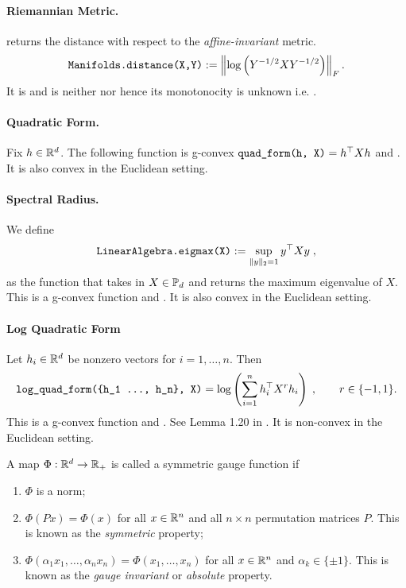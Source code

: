 \documentclass[twoside,11pt]{article}
\begin{document}
\paragraph{Riemannian Metric.}
 returns the distance with respect to the \textit{affine-invariant} metric. 
\[
\texttt{Manifolds.distance(X,Y)} := \left\|\log \left(Y^{-1/2}X Y^{-1/2}\right)\right\|_F.
\] 
It is  and is neither  nor  hence its monotonocity is unknown i.e. .

\paragraph{Quadratic Form.}
Fix $h \in \mathbb{R}^d$. The following function is g-convex $\texttt{quad\_form(h, X)} = h^\top X h$ and . It is also convex in the Euclidean setting. 


\paragraph{Spectral Radius.} We define
\[\texttt{LinearAlgebra.eigmax(X)} := \sup_{\|y\|_2 = 1}y^\top X y  \; ,\]
as the function that takes in $X \in \mathbb{P}_d$ and returns the maximum eigenvalue of $X$. This is a g-convex function and . It is also convex in the Euclidean setting.


\paragraph{Log Quadratic Form}

 Let $h_i \in \mathbb{R}^d$ be nonzero vectors for $i = 1, \ldots, n$. Then  
\[
\texttt{log\_quad\_form(\{h\_1 \ldots, h\_n\}, X)} = \log \left(\sum_{i=1}^n h_i^\top X^{r} h_i \right) \; , \qquad r \in \{-1, 1\}.
\]
This is a g-convex function and . See Lemma 1.20 in \citep{wieselstructuredcovariance}. It is non-convex in the Euclidean setting.


\begin{definition} 
     A map $\Phi:\mathbb{R}^d \to \mathbb{R}_+$ is called a symmetric gauge function if 
    \begin{enumerate}
        \item $\Phi$ is a norm;
        \item $\Phi(Px) = \Phi(x)$ for all $x \in \mathbb{R}^n$ and all $n\times n$ permutation matrices $P$. This is known as the \textit{symmetric} property;
        \item $\Phi(\alpha_1 x_1, \ldots, \alpha_n x_n) = \Phi(x_1, \ldots, x_n)$ for all $x \in \mathbb{R}^n$ and $\alpha_k \in \{\pm 1\}$. This is known as the \textit{gauge invariant} or \textit{absolute} property.
    \end{enumerate}
\end{definition}
\end{document}
